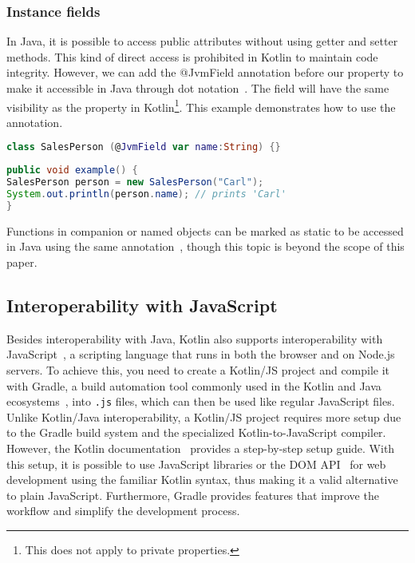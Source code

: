 \documentclass[a4paper,11pt]{article}
\begin{document}
\subsubsection{Instance fields}
In Java, it is possible to access public attributes without using getter and setter methods. This kind of direct access is prohibited in Kotlin to maintain code integrity. However, we can add the @JvmField annotation before our property to make it accessible in Java through dot notation~\cite{interop-instance-fields}. The field will have the same visibility as the property in Kotlin\footnote{This does not apply to private properties.}.
This example demonstrates how to use the annotation.
\begin{lstlisting}[language=Kotlin]
class SalesPerson (@JvmField var name:String) {}
\end{lstlisting}
\begin{lstlisting}[language=Java]
public void example() {
SalesPerson person = new SalesPerson("Carl");
System.out.println(person.name); // prints 'Carl'
}
\end{lstlisting}

Functions in companion or named objects can be marked as static to be accessed in Java using the same annotation~\cite{interop-static-fields}, though this topic is beyond the scope of this paper.

\subsection{Interoperability with JavaScript}
Besides interoperability with Java, Kotlin also supports interoperability with JavaScript~\cite{interopjs}, a scripting language that runs in both the browser and on Node.js servers. To achieve this, you need to create a Kotlin/JS project and compile it with Gradle, a build automation tool commonly used in the Kotlin and Java ecosystems~\cite{gradle}, into \texttt{.js} files, which can then be used like regular JavaScript files. Unlike Kotlin/Java interoperability, a Kotlin/JS project requires more setup due to the Gradle build system and the specialized Kotlin-to-JavaScript compiler. However, the Kotlin documentation~\cite{interopjs} provides a step-by-step setup guide. With this setup, it is possible to use JavaScript libraries or the DOM API~\cite{interopjs-dom} for web development using the familiar Kotlin syntax, thus making it a valid alternative to plain JavaScript. Furthermore, Gradle provides features that improve the workflow and simplify the development process.
\end{document}
